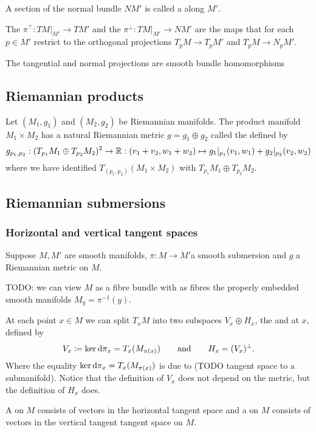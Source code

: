 A section of the normal bundle $NM'$ is called a  along $M'$.

The  $\pi^\top: TM|_{M'}\to TM'$ and the  $\pi^\perp: TM|_{M'}\to NM'$ are the maps that for each $p\in M'$ restrict to the orthogonal projections $T_pM\to T_pM'$ and $T_pM\to N_pM'$.

\begin{lemma}
The tangential and normal projections are smooth bundle homomorphisms
\end{lemma}

\subsection{Riemannian products}
\begin{definition}
Let $(M_1,g_1)$ and $(M_2,g_2)$ be Riemannian manifolds. The product manifold $M_1\times M_2$ has a natural Riemannian metric $g=g_1\oplus g_2$ called the  defined by
\[ g_{p_1,p_2}: (T_{p_1}M_1\oplus T_{p_2}M_2)^2 \to \mathbb{R}: (v_1+v_2, w_1+w_2) \mapsto g_1|_{p_1}(v_1,w_1) + g_2|_{p_2}(v_2,w_2) \]
where we have identified $T_{(p_1,p_2)}(M_1\times M_2)$ with $T_{p_1}M_1\oplus T_{p_2}M_2$.
\end{definition}

\subsection{Riemannian submersions}
\subsubsection{Horizontal and vertical tangent spaces}
Suppose $M,M'$ are smooth manifolds, $\pi:M\to M'$a smooth submersion and $g$ a Riemannian metric on $M$.

TODO: we can view $M$ as a fibre bundle with as fibres the properly embedded smooth manifolds $M_y = \pi^{-1}(y)$.

At each point $x\in M$ we can split $T_xM$ into two subspaces $V_x \oplus H_x$, the  and  at $x$, defined by
\[ V_x \coloneqq \ker\operatorname{d \!}{\pi}_x = T_x(M_{\pi(x)}) \qquad \text{and} \qquad H_x = (V_x)^\perp. \]
Where the equality $\ker\operatorname{d \!}{\pi}_x = T_x(M_{\pi(x)})$ is due to (TODO tangent space to a submanifold). Notice that the definition of $V_x$ does not depend on the metric, but the definition of $H_x$ does.

A  on $M$ consists of vectors in the horizontal tangent space and a  on $M$ consists of vectors in the vertical tangent tangent space on $M$.

